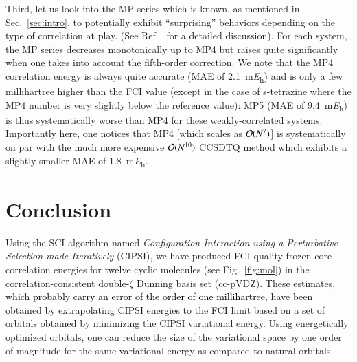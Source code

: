 \documentclass[aip,jcp,reprint,noshowkeys,superscriptaddress,floatfix]{revtex4-1}
\newcommand{\alert}[1]{\textcolor{black}{#1}}
\begin{document}
Third, let us look into the MP series which is known, as mentioned in Sec.~\ref{sec:intro}, to potentially exhibit ``surprising'' behaviors depending on the type of correlation at play.\cite{Laidig_1985,Knowles_1985,Handy_1985,Gill_1986,Laidig_1987,Nobes_1987,Gill_1988,Gill_1988a,Lepetit_1988,Malrieu_2003}
(See Ref.~ for a detailed discussion).
For each system, the MP series decreases monotonically up to MP4 but raises quite significantly when one takes into account the fifth-order correction.
We note that the MP4 correlation energy is always quite accurate (MAE of \SI{2.1}{\milli\hartree}) and is only a few millihartree higher than the FCI value (except in the case of s-tetrazine where the MP4 number is very slightly below the reference value): MP5 (MAE of \SI{9.4}{\milli\hartree}) is thus systematically worse than MP4 for these weakly-correlated systems.
Importantly here, one notices that MP4 [which scales as $\order*{N^7}$] is systematically on par with the much more expensive $\order*{N^{10}}$ CCSDTQ method which exhibits a slightly smaller MAE of \SI{1.8}{\milli\hartree}.

\section{Conclusion}
\label{sec:ccl}
Using the SCI algorithm named \textit{Configuration Interaction using a Perturbative Selection made Iteratively} (CIPSI), we have produced FCI-quality frozen-core correlation energies for twelve cyclic molecules (see Fig.~\ref{fig:mol}) in the correlation-consistent double-$\zeta$ Dunning basis set (cc-pVDZ).
These estimates, which \alert{probably carry an error of the order of one millihartree}, have been obtained by extrapolating CIPSI energies to the FCI limit based on a set of orbitals obtained by minimizing the CIPSI variational energy.
Using energetically optimized orbitals, one can reduce the size of the variational space by one order of magnitude for the same variational energy as compared to natural orbitals.
\end{document}
